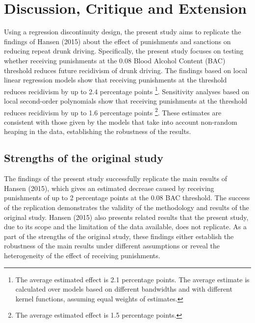 \documentclass[
  11pt,
]{article}
\begin{document}
\endgroup

\hypertarget{discussion-critique-and-extension}{%
\section{Discussion, Critique and
Extension}\label{discussion-critique-and-extension}}

Using a regression discontinuity design, the present study aims to
replicate the findings of Hansen (2015) about the effect of punishments
and sanctions on reducing repeat drunk driving. Specifically, the
present study focuses on testing whether receiving punishments at the
0.08 Blood Alcohol Content (BAC) threshold reduces future recidivism of
drunk driving. The findings based on local linear regression models show
that receiving punishments at the threshold reduces recidivism by up to
2.4 percentage points
\footnote{The average estimated effect is 2.1 percentage points. The average estimate is calculated over models based on different bandwidths and with different kernel functions, assuming equal weights of estimates.}.
Sensitivity analyses based on local second-order polynomials show that
receiving punishments at the threshold reduces recidivism by up to 1.6
percentage points
\footnote{The average estimated effect is 1.5 percentage points.}. These
estimates are consistent with those given by the models that take into
account non-random heaping in the data, establishing the robustness of
the results.

\hypertarget{strengths-of-the-original-study}{%
\subsection{Strengths of the original
study}\label{strengths-of-the-original-study}}

The findings of the present study successfully replicate the main
results of Hansen (2015), which gives an estimated decrease caused by
receiving punishments of up to 2 percentage points at the 0.08 BAC
threshold. The success of the replication demonstrates the validity of
the methodology and results of the original study. Hansen (2015) also
presents related results that the present study, due to its scope and
the limitation of the data available, does not replicate. As a part of
the strengths of the original study, these findings either establish the
robustness of the main results under different assumptions or reveal the
heterogeneity of the effect of receiving punishments.
\end{document}
